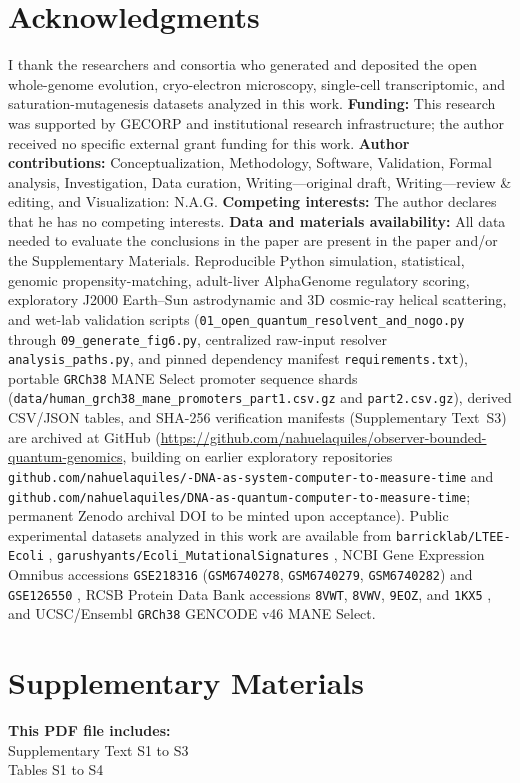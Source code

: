 \documentclass[10pt,letterpaper]{article}
\theoremstyle{plain}
\theoremstyle{definition}
\begin{document}
\section*{Acknowledgments}
I thank the researchers and consortia who generated and deposited the open whole-genome evolution, cryo-electron microscopy, single-cell transcriptomic, and saturation-mutagenesis datasets analyzed in this work.
\textbf{Funding:} This research was supported by GECORP and institutional research infrastructure; the author received no specific external grant funding for this work.
\textbf{Author contributions:} Conceptualization, Methodology, Software, Validation, Formal analysis, Investigation, Data curation, Writing---original draft, Writing---review \& editing, and Visualization: N.A.G.
\textbf{Competing interests:} The author declares that he has no competing interests.
\textbf{Data and materials availability:} All data needed to evaluate the conclusions in the paper are present in the paper and/or the Supplementary Materials. Reproducible Python simulation, statistical, genomic propensity-matching, adult-liver AlphaGenome regulatory scoring, exploratory J2000 Earth--Sun astrodynamic and 3D cosmic-ray helical scattering, and wet-lab validation scripts (\texttt{01\_open\_quantum\_resolvent\_and\_nogo.py} through \texttt{09\_generate\_fig6.py}, centralized raw-input resolver \texttt{analysis\_paths.py}, and pinned dependency manifest \texttt{requirements.txt}), portable \texttt{GRCh38} MANE Select promoter sequence shards (\texttt{data/human\_grch38\_mane\_promoters\_part1.csv.gz} and \texttt{part2.csv.gz}), derived CSV/JSON tables, and SHA-256 verification manifests (Supplementary Text~S3) are archived at GitHub (\url{https://github.com/nahuelaquiles/observer-bounded-quantum-genomics}, building on earlier exploratory repositories \texttt{github.com/nahuelaquiles/-DNA-as-system-computer-to-measure-time} and \texttt{github.com/nahuelaquiles/DNA-as-quantum-computer-to-measure-time}; permanent Zenodo archival DOI to be minted upon acceptance). Public experimental datasets analyzed in this work are available from \texttt{barricklab/LTEE-Ecoli} \cite{tenaillon2016nature}, \texttt{garushyants/Ecoli\_MutationalSignatures} \cite{foster2015pnas,garushyants2024gbe}, NCBI Gene Expression Omnibus accessions \texttt{GSE218316} (\texttt{GSM6740278}, \texttt{GSM6740279}, \texttt{GSM6740282}) \cite{thomaidou2023diabetologia} and \texttt{GSE126550} \cite{kircher2019natcommun}, RCSB Protein Data Bank accessions \texttt{8VWT}, \texttt{8VWV}, \texttt{9EOZ}, and \texttt{1KX5} \cite{ren2024natcommun}, and UCSC/Ensembl \texttt{GRCh38} GENCODE v46 MANE Select.

\section*{Supplementary Materials}
\noindent\textbf{This PDF file includes:}\\
Supplementary Text S1 to S3\\
Tables S1 to S4
\end{document}
